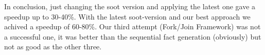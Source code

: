 \documentclass{dithesis}
\begin{document}
    In conclusion, just changing the soot version and applying the latest one gave a speedup up to 30-40\%. With the latest soot-version and our best approach we achived a speedup of 60-80\%. Our third attempt (Fork/Join Framework) was not a successful one, it was better than the sequential fact generation (obviously) but not as good as the other three. 

\end{document}
